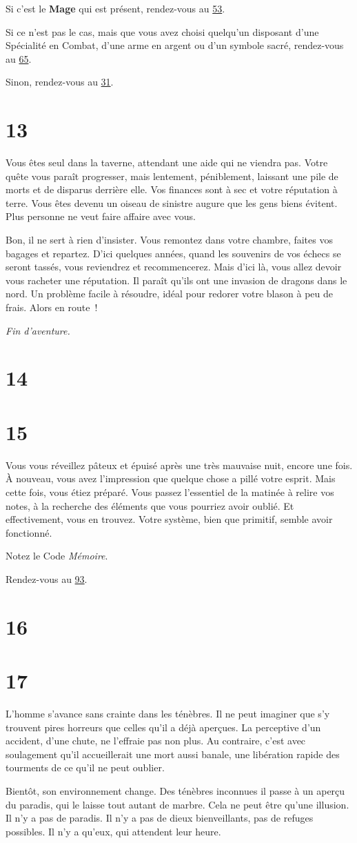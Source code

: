 \documentclass{report}
\newcommand{\gsection}[1]{
    \section{#1}
    \label{section-#1}
}
\newcommand{\glink}[1]{\hyperref[section-#1]{#1}}
\newcommand{\hero}[1]{
    \textbf{#1}
}
\newcommand{\theend}{
    \emph{Fin d'aventure.}
}
\begin{document}
Si c'est le \hero{Mage} qui est présent, rendez-vous au \glink{53}.

Si ce n'est pas le cas, mais que vous avez choisi quelqu'un disposant d'une Spécialité en Combat, d'une arme en argent ou d'un symbole sacré, rendez-vous au \glink{65}.

Sinon, rendez-vous au \glink{31}.

\gsection{13}

Vous êtes seul dans la taverne, attendant une aide qui ne viendra pas. Votre quête vous paraît progresser, mais lentement, péniblement, laissant une pile de morts et de disparus derrière elle. Vos finances sont à sec et votre réputation à terre. Vous êtes devenu un oiseau de sinistre augure que les gens biens évitent. Plus personne ne veut faire affaire avec vous.

Bon, il ne sert à rien d'insister. Vous remontez dans votre chambre, faites vos bagages et repartez. D'ici quelques années, quand les souvenirs de vos échecs se seront tassés, vous reviendrez et recommencerez. Mais d'ici là, vous allez devoir vous racheter une réputation. Il paraît qu'ils ont une invasion de dragons dans le nord. Un problème facile à résoudre, idéal pour redorer votre blason à peu de frais. Alors en route !

\theend

\gsection{14}

\gsection{15}

Vous vous réveillez pâteux et épuisé après une très mauvaise nuit, encore une fois. À nouveau, vous avez l'impression que quelque chose a pillé votre esprit. Mais cette fois, vous étiez préparé. Vous passez l'essentiel de la matinée à relire vos notes, à la recherche des éléments que vous pourriez avoir oublié. Et effectivement, vous en trouvez. Votre système, bien que primitif, semble avoir fonctionné.

Notez le Code \emph{Mémoire}.

Rendez-vous au \glink{93}.

\gsection{16}

\gsection{17}

L'homme s'avance sans crainte dans les ténèbres. Il ne peut imaginer que s'y trouvent pires horreurs que celles qu'il a déjà aperçues. La perceptive d'un accident, d'une chute, ne l'effraie pas non plus. Au contraire, c'est avec soulagement qu'il accueillerait une mort aussi banale, une libération rapide des tourments de ce qu'il ne peut oublier.

Bientôt, son environnement change. Des ténèbres inconnues il passe à un aperçu du paradis, qui le laisse tout autant de marbre. Cela ne peut être qu'une illusion. Il n'y a pas de paradis. Il n'y a pas de dieux bienveillants, pas de refuges possibles. Il n'y a qu'eux, qui attendent leur heure.
\end{document}
